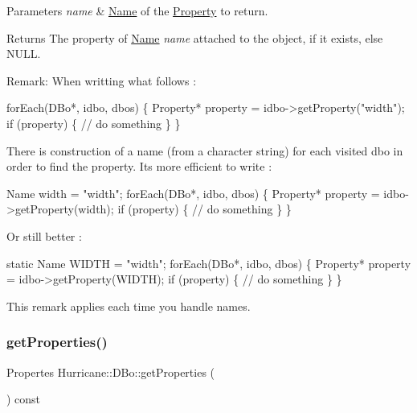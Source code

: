 \begin{DoxyParams}{Parameters}
{\em name} & \hyperlink{classHurricane_1_1Name}{Name} of the \hyperlink{classHurricane_1_1Property}{Property} to return. \\
\hline
\end{DoxyParams}
\begin{DoxyReturn}{Returns}
The property of \hyperlink{classHurricane_1_1Name}{Name} {\itshape name} attached to the object, if it exists, else {\ttfamily N\+U\+LL}.
\end{DoxyReturn}
\begin{DoxyParagraph}{Remark\+:}
When writting what follows \+: 
\begin{DoxyCode}
forEach(DBo*, idbo, dbos) \{
  Property* \textcolor{keyword}{property} = idbo->getProperty(\textcolor{stringliteral}{"width"});
  \textcolor{keywordflow}{if} (property) \{
    \textcolor{comment}{// do something}
  \}
\}
\end{DoxyCode}

\end{DoxyParagraph}
There is construction of a name (from a character string) for each visited dbo in order to find the property. It\textquotesingle{}s more efficient to write \+: 
\begin{DoxyCode}
Name width = \textcolor{stringliteral}{"width"};
forEach(DBo*, idbo, dbos) \{
  Property* \textcolor{keyword}{property} = idbo->getProperty(width);
  \textcolor{keywordflow}{if} (property) \{
    \textcolor{comment}{// do something}
  \}
\}
\end{DoxyCode}
 Or still better \+: 
\begin{DoxyCode}
\textcolor{keyword}{static} Name WIDTH = \textcolor{stringliteral}{"width"};
forEach(DBo*, idbo, dbos) \{
  Property* \textcolor{keyword}{property} = idbo->getProperty(WIDTH);
  \textcolor{keywordflow}{if} (property) \{
    \textcolor{comment}{// do something}
  \}
\}
\end{DoxyCode}
 This remark applies each time you handle names. \mbox{\label{classHurricane_1_1DBo_aec46894a10e83abb54c495dc4d90f2d3}} 
\subsubsection{\texorpdfstring{get\+Properties()}{getProperties()}}
{\footnotesize\ttfamily Propertes Hurricane\+::\+D\+Bo\+::get\+Properties (\begin{DoxyParamCaption}{ }\end{DoxyParamCaption}) const}

